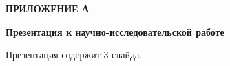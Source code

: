 \begin{center}
    \textbf{ПРИЛОЖЕНИЕ А}
\end{center}

\begin{center}
    \textbf{Презентация к научно-исследовательской работе}
\end{center}

Презентация содержит 3 слайда.